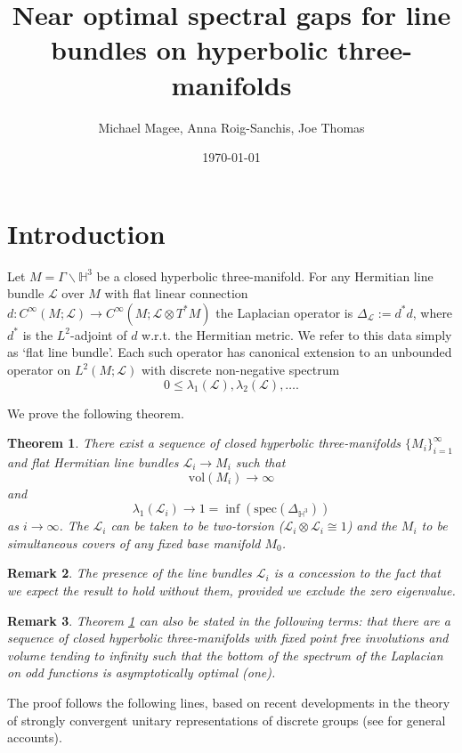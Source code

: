\documentclass[12pt]{article}
\title{Near optimal spectral gaps for line bundles on hyperbolic three-manifolds}
\author{Michael Magee, Anna Roig-Sanchis, Joe Thomas}
\date{\today}
\newtheorem{theorem}{Theorem}[section]
\newtheorem{remark}[theorem]{Remark}
\newcommand{\1}{\mathds{1}}
\begin{document}
\maketitle


\section{Introduction}

Let $M = \Gamma \backslash \mathbb{H}^3$ be a closed hyperbolic three-manifold. For any Hermitian line bundle $\mathcal{L}$ over $M$ with flat linear connection $d : C^\infty(M;\mathcal{L}) \to C^\infty(M;\mathcal{L}\otimes T^{*}M)$ the Laplacian operator is $\Delta_\mathcal{L}:= d^{*}d$, where $d^{*}$ is the $L^2$-adjoint of $d$ w.r.t. the Hermitian metric. We refer to this data simply as `flat line bundle'. Each such operator has canonical extension to an unbounded operator on $L^2(M;\mathcal{L})$ with discrete non-negative spectrum
\[ 0\leq \lambda_1(\mathcal{L}), \lambda_2(\mathcal{L}), \ldots. \]

We prove the following theorem.
\begin{theorem}\label{thm:main}
There exist a sequence of closed hyperbolic three-manifolds $\{M_i\}_{i=1}^\infty$ and flat Hermitian line bundles $\mathcal{L}_i\to M_i$ such that 
\[
\mathrm{vol}( M_i ) \to \infty
\] and
\[ \lambda_1(\mathcal{L}_i) \to 1 = \inf (\mathrm{spec} (\Delta_{ \mathbb{H}^3} ))\]
as $i \to \infty$.
The $\mathcal{L}_i$ can be taken to be two-torsion ($\mathcal{L}_i\otimes \mathcal{L}_i \cong 1$) and the $M_i$ to be simultaneous covers of any fixed base manifold $M_0$.
\end{theorem}
\begin{remark}The presence of the line bundles $\mathcal{L}_i$ is a concession to the fact that we expect the result to hold without them, provided we exclude the zero eigenvalue.
\end{remark}
\begin{remark}Theorem \ref{thm:main} can also be stated in the following terms: that there are a sequence of closed hyperbolic three-manifolds with fixed point free involutions and volume tending to infinity such that the bottom of the spectrum of the Laplacian on \emph{odd} functions is asymptotically optimal (one).
\end{remark}
The proof follows the following lines, based on recent developments in the theory of strongly convergent unitary representations of discrete groups (see \cite{magee2025strongconvergenceunitarypermutation, vanhandel2026strongconvergencephenomenon} for general accounts).
\end{document}
